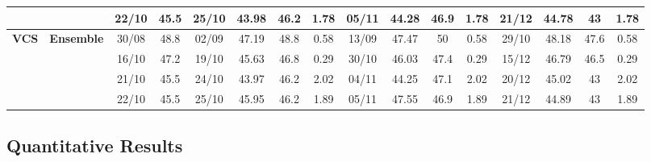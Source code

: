 \documentclass{ieeeaccess}
\begin{document}
\begin{table}[!h]
\begin{tabular}{llcc|cccc|cccc|cccc}
&
& 22/10 & 45.5 & 25/10 & 43.98 & 46.2 & 1.78 & 05/11 & 44.28 & 46.9 & 1.78 & 21/12 & 44.78 & 43 & 1.78 \\
\midrule



\multirow{4}{*}{\textbf{VCS}} 
& \textbf{Ensemble}
& 30/08 & 48.8 & 02/09 & 47.19 & 48.8 & 0.58 & 13/09 & 47.47 & 50 & 0.58 & 29/10 & 48.18 & 47.6 & 0.58 \\

&
& 16/10 & 47.2 & 19/10 & 45.63 & 46.8 & 0.29 & 30/10 & 46.03 & 47.4 & 0.29 & 15/12 & 46.79 & 46.5 & 0.29 \\

&
& 21/10 & 45.5 & 24/10 & 43.97 & 46.2 & 2.02 & 04/11 & 44.25 & 47.1 & 2.02 & 20/12 & 45.02 & 43 & 2.02 \\

&
& 22/10 & 45.5 & 25/10 & 45.95 & 46.2 & 1.89 & 05/11 & 47.55 & 46.9 & 1.89 & 21/12 & 44.89 & 43 & 1.89  \\


\bottomrule
\end{tabular}
\end{table}


\newpage
\twocolumn
\subsection{Quantitative Results}
\end{document}
